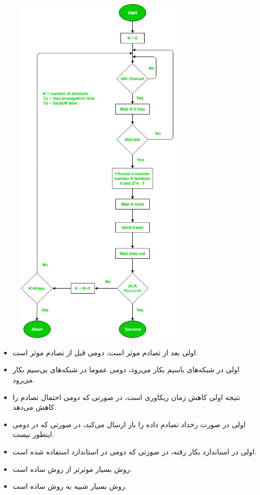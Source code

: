 {\begin{figure}[H]
    \includegraphics[width=8cm]{Images/CSMA_CA.png}
    \centering
    \caption{}
\end{figure}

\begin{itemize}
    \item
    اولی بعد از تصادم موثر است، دومی قبل از تصادم موثر است.
    
    \item
    اولی در شبکه‌های باسیم بکار می‌رود، دومی عموما در شبکه‌های بی‌سیم بکار می‌رود.
    
    \item
    نتیجه اولی کاهش زمان ریکاوری است، در صورتی که دومی احتمال تصادم را کاهش می‌دهد.
    
    \item
    اولی در صورت رخداد تصادم داده را باز ارسال می‌کند، در صورتی که در دومی اینطور نیست.
    
    \item
    اولی در استاندارد 
    بکار رفته، در صورتی که دومی در استاندارد
    استفاده شده است.
    
    \item
    روش
    بسیار موثر‌تر از روش
    ساده است.
    
    \item
    روش
    بسیار شبیه به روش
    ساده است.
\end{itemize}
}
